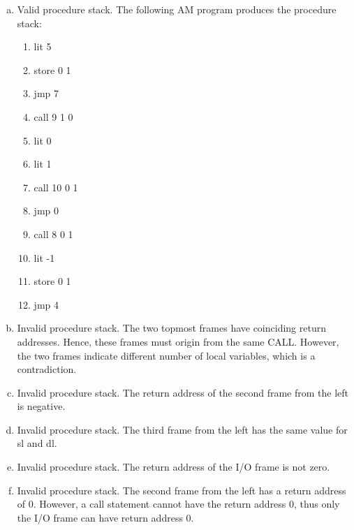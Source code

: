 \begin{solution}
  \begin{enumerate}[(a)]
    \item Valid procedure stack. The following AM program produces the procedure stack:
    \begin{enumerate}[1.]
      \item lit 5
      \item store 0 1
      \item jmp 7
      \item call 9 1 0
      \item lit 0
      \item lit 1
      \item call 10 0 1
      \item jmp 0
      \item call 8 0 1
      \item lit -1
      \item store 0 1
      \item jmp 4
    \end{enumerate}
    \item Invalid procedure stack. The two topmost frames have coinciding return addresses. Hence, these frames must origin from the same CALL. However, the two frames indicate different number of local variables, which is a contradiction.
    \item Invalid procedure stack. The return address of the second frame from the left is negative.
    \item Invalid procedure stack. The third frame from the left has the same value for sl and dl.
    \item Invalid procedure stack. The return address of the I/O frame is not zero.
    \item Invalid procedure stack. The second frame from the left has a return address of $0$. However, a call statement cannot have the return address 0, thus only the I/O frame can have return address 0.
  \end{enumerate}
\end{solution}
